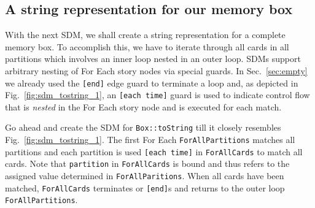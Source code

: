 \subsection{A string representation for our memory box}

With the next SDM, we shall create a string representation for a complete memory
box.  To accomplish this, we have to iterate through all cards in all partitions
which involves an inner loop nested in an outer loop.  SDMs support arbitrary nesting
of For Each story nodes via special guards.  In Sec.~\ref{sec:empty} we already
used the \texttt{[end]} edge guard to terminate a loop and, as depicted in
Fig.~\ref{fig:sdm_tostring_1}, an \texttt{[each time]} guard is used to indicate
control flow that is \emph{nested} in the For Each story node and is executed
for each match.

Go ahead and create the SDM for \texttt{Box::toString} till it closely resembles
Fig.~\ref{fig:sdm_tostring_1}.  The first For Each \texttt{ForAllPartitions}
matches all partitions and each partition is used \texttt{[each time]} in
\texttt{ForAllCards} to match all cards.  Note that \texttt{partition} in
\texttt{ForAllCards} is bound  and thus refers to the assigned value determined
in \texttt{ForAllParitions}.  When all cards have been matched,
\texttt{ForAllCards} terminates or \texttt{[end]}s and returns to the outer loop
\texttt{ForAllPartitions}.


